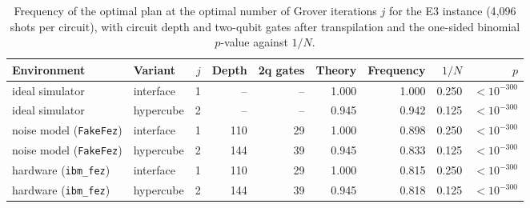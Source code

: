 \begin{table}[t]
\centering
\caption{Frequency of the optimal plan at the optimal number of Grover iterations $j$ for the E3 instance (4{,}096 shots per circuit), with circuit depth and two-qubit gates after transpilation and the one-sided binomial $p$-value against $1/N$.}\label{tab:hardware}
\small
\begin{tabular}{llrrrrrrr}
\toprule
Environment & Variant & $j$ & Depth & 2q gates & Theory & Frequency & $1/N$ & $p$ \\
\midrule
ideal simulator & interface & 1 & -- & -- & 1.000 & 1.000 & 0.250 & $<10^{-300}$ \\
ideal simulator & hypercube & 2 & -- & -- & 0.945 & 0.942 & 0.125 & $<10^{-300}$ \\
noise model (\texttt{FakeFez}) & interface & 1 & 110 & 29 & 1.000 & 0.898 & 0.250 & $<10^{-300}$ \\
noise model (\texttt{FakeFez}) & hypercube & 2 & 144 & 39 & 0.945 & 0.833 & 0.125 & $<10^{-300}$ \\
hardware (\texttt{ibm\_fez}) & interface & 1 & 110 & 29 & 1.000 & 0.815 & 0.250 & $<10^{-300}$ \\
hardware (\texttt{ibm\_fez}) & hypercube & 2 & 144 & 39 & 0.945 & 0.818 & 0.125 & $<10^{-300}$ \\
\bottomrule
\end{tabular}
\end{table}
